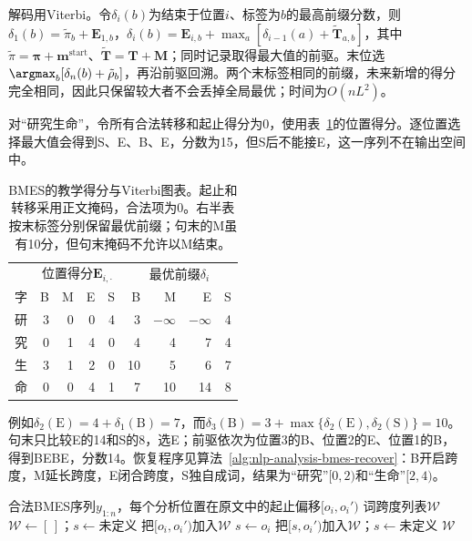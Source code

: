 解码用Viterbi。令$\delta_i(b)$为结束于位置$i$、标签为$b$的最高前缀分数，则$\delta_1(b)=\tilde\pi_b+\bm E_{1,b}$，$\delta_i(b)=\bm E_{i,b}+\max_a[\delta_{i-1}(a)+\tilde{\bm T}_{a,b}]$，其中$\tilde\pi=\bm\pi+\bm m^{\mathrm{start}}$、$\tilde{\bm T}=\bm T+\bm M$；同时记录取得最大值的前驱。末位选$\argmax_b[\delta_n(b)+\tilde\rho_b]$，再沿前驱回溯。两个末标签相同的前缀，未来新增的得分完全相同，因此只保留较大者不会丢掉全局最优；时间为$O(nL^2)$。

对“研究生命”，令所有合法转移和起止得分为0，使用表~\ref{tab:nlp-analysis-viterbi}的位置得分。逐位置选择最大值会得到S、E、B、E，分数为15，但S后不能接E，这一序列不在输出空间中。

\begin{table}[htbp]
  \centering
  \begin{tabular}{@{}c rrrr rrrr@{}}
    \toprule
    &\multicolumn{4}{c}{位置得分$\bm E_{i,\cdot}$}
    &\multicolumn{4}{c}{最优前缀$\delta_i$}\\
    字&B&M&E&S&B&M&E&S\\
    \midrule
    研&3&0&0&4&3&$-\infty$&$-\infty$&4\\
    究&0&1&4&0&4&4&7&4\\
    生&3&1&2&0&10&5&6&7\\
    命&0&0&4&1&7&10&14&8\\
    \bottomrule
  \end{tabular}
  \caption{BMES的教学得分与Viterbi图表。起止和转移采用正文掩码，合法项为0。右半表按末标签分别保留最优前缀；句末的M虽有10分，但句末掩码不允许以M结束。}
  \label{tab:nlp-analysis-viterbi}
\end{table}

例如$\delta_2(\mathrm E)=4+\delta_1(\mathrm B)=7$，而$\delta_3(\mathrm B)=3+\max\{\delta_2(\mathrm E),\delta_2(\mathrm S)\}=10$。句末只比较E的14和S的8，选E；前驱依次为位置3的B、位置2的E、位置1的B，得到BEBE，分数14。恢复程序见算法~\ref{alg:nlp-analysis-bmes-recover}：B开启跨度，M延长跨度，E闭合跨度，S独自成词，结果为“研究”$[0,2)$和“生命”$[2,4)$。

\begin{algorithm}[BMES标签序列到原文字符跨度的恢复]
  \label{alg:nlp-analysis-bmes-recover}
  \begin{algorithmic}[1]
    \Require 合法BMES序列$y_{1:n}$，每个分析位置在原文中的起止偏移$[o_i,o_i')$
    \Ensure 词跨度列表$\mathcal W$
    \State $\mathcal W\gets[\,]$；$s\gets\text{未定义}$
        \State 把$[o_i,o_i')$加入$\mathcal W$
        \State $s\gets o_i$
        \State 把$[s,o_i')$加入$\mathcal W$；$s\gets\text{未定义}$
      \EndIf {}
    \EndFor
    \State \Return $\mathcal W$ 
  \end{algorithmic}
\end{algorithm}

